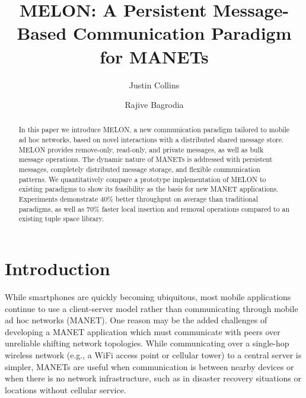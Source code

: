 \documentclass[lnicst]{svmultln}
\begin{document}
\mainmatter  %

\title{MELON: A Persistent Message-Based Communication Paradigm for MANETs}


\author{Justin Collins\and Rajive Bagrodia}




\maketitle
\begin{abstract}
In this paper we introduce MELON, a new communication paradigm tailored to mobile ad hoc networks, based on novel interactions with a distributed shared message store. MELON provides remove-only, read-only, and private messages, as well as bulk message operations. The dynamic nature of MANETs is addressed with persistent messages, completely distributed message storage, and flexible communication patterns. We quantitatively compare a prototype implementation of MELON to existing paradigms to show its feasibility as the basis for new MANET applications. Experiments demonstrate 40\% better throughput on average than traditional paradigms, as well as 70\% faster local insertion and removal operations compared to an existing tuple space library.
\end{abstract}

\section{Introduction}

While smartphones are quickly becoming ubiquitous, most mobile applications continue to use a client-server model rather than communicating through mobile ad hoc networks (MANET). One reason may be the added challenges of developing a MANET application which must communicate with peers over unreliable shifting network topologies. While communicating over a single-hop wireless network (e.g., a WiFi access point or cellular tower) to a central server is simpler, MANETs are useful when communication is between nearby devices or when there is no network infrastructure, such as in disaster recovery situations or locations without cellular service.
\end{document}
